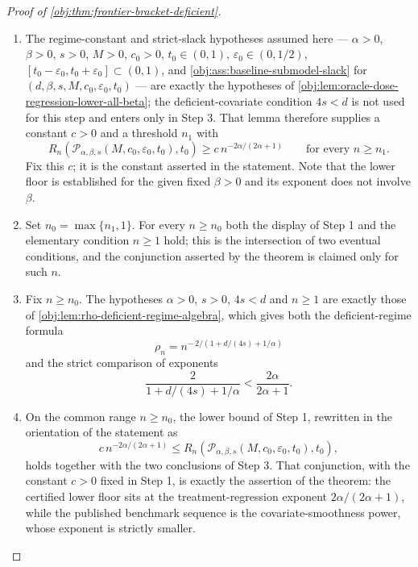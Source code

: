 \begin{proof}[Proof of \cref{obj:thm:frontier-bracket-deficient}]
\begin{enumerate}
\item The regime-constant and strict-slack hypotheses assumed here — \(\alpha>0\), \(\beta>0\),
\(s>0\), \(M>0\), \(c_0>0\), \(t_0\in(0,1)\), \(\varepsilon_0\in(0,1/2)\),
\([t_0-\varepsilon_0,t_0+\varepsilon_0]\subset(0,1)\), and \cref{obj:ass:baseline-submodel-slack}
for \((d,\beta,s,M,c_0,\varepsilon_0,t_0)\) — are exactly the hypotheses of
\cref{obj:lem:oracle-dose-regression-lower-all-beta}; the deficient-covariate condition \(4s<d\) is
not used for this step and enters only in Step 3. That lemma therefore supplies a constant \(c>0\)
and a threshold \(n_1\) with
\[
R_n\!\left(\mathcal P_{\alpha,\beta,s}(M,c_0,\varepsilon_0,t_0),t_0\right)
\ge
c\,n^{-2\alpha/(2\alpha+1)}
\qquad\text{for every }n\ge n_1 .
\]
Fix this \(c\); it is the constant asserted in the statement. Note that the lower floor is
established for the given fixed \(\beta>0\) and its exponent does not involve \(\beta\).

\item Set \(n_0=\max\{n_1,1\}\). For every \(n\ge n_0\) both the display of Step 1 and the
elementary condition \(n\ge1\) hold; this is the intersection of two eventual conditions, and the
conjunction asserted by the theorem is claimed only for such \(n\).

\item Fix \(n\ge n_0\). The hypotheses \(\alpha>0\), \(s>0\), \(4s<d\) and \(n\ge1\) are exactly
those of \cref{obj:lem:rho-deficient-regime-algebra}, which gives both the deficient-regime formula
\[
\rho_n
=
n^{-\,2/(1+d/(4s)+1/\alpha)}
\]
and the strict comparison of exponents
\[
\frac{2}{1+d/(4s)+1/\alpha}
<
\frac{2\alpha}{2\alpha+1}.
\]

\item On the common range \(n\ge n_0\), the lower bound of Step 1, rewritten in the orientation of
the statement as
\[
c\,n^{-2\alpha/(2\alpha+1)}
\le
R_n\!\left(
\mathcal P_{\alpha,\beta,s}(M,c_0,\varepsilon_0,t_0),t_0
\right),
\]
holds together with the two conclusions of Step 3. That conjunction, with the constant \(c>0\) fixed
in Step 1, is exactly the assertion of the theorem: the certified lower floor sits at the
treatment-regression exponent \(2\alpha/(2\alpha+1)\), while the published benchmark sequence is the
covariate-smoothness power, whose exponent is strictly smaller.
\end{enumerate}
\end{proof}
